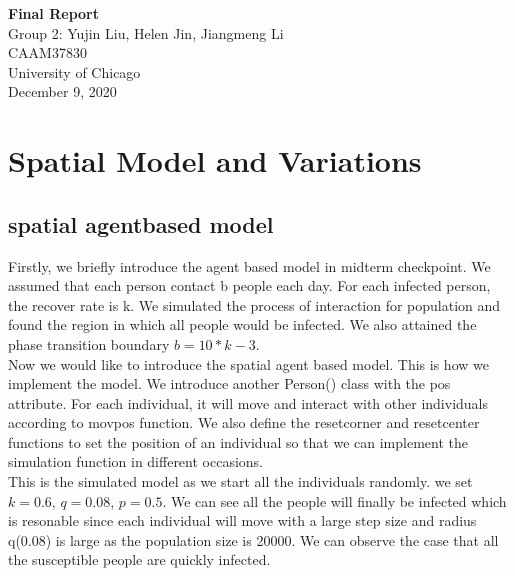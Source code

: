 \documentclass{article}
\begin{document}
\begin{titlepage}
  \begin{center}

    \huge
    \textbf{Final Report}\\
    \vspace{4.5cm}
    \LARGE
    Group 2: Yujin Liu, Helen Jin, Jiangmeng Li\\
    \vspace{4.5cm}
    \Large
    CAAM37830\\
    \vspace{1cm}
    University of Chicago\\
    \vspace{1cm}
    December 9, 2020

  \end{center}

\end{titlepage}

\section{Spatial Model and Variations}
\subsection{spatial agentbased model}
Firstly, we briefly introduce the agent based model in midterm checkpoint. We assumed that each person contact b people each day. For each infected person, the recover rate is k. We simulated the process of interaction for population and found the region in which all people would be infected. We also attained the phase transition boundary $b = 10*k - 3$.\\

Now we would like to introduce the spatial agent based model. This is how we implement the model. We introduce another Person() class with the pos attribute. For each individual, it will move and interact with other individuals according to movpos function. We also define the resetcorner and resetcenter functions to set the position of an individual so that we can implement the simulation function in different occasions.\\

This is the simulated model as we start all the individuals randomly. we set $k = 0.6$, $q = 0.08$, $p = 0.5$. We can see all the people will  finally be infected which is resonable since each individual will move with a large step size and radius q(0.08) is large as the population size is 20000. We can observe the case that all the susceptible people are quickly infected.\\
\end{document}
